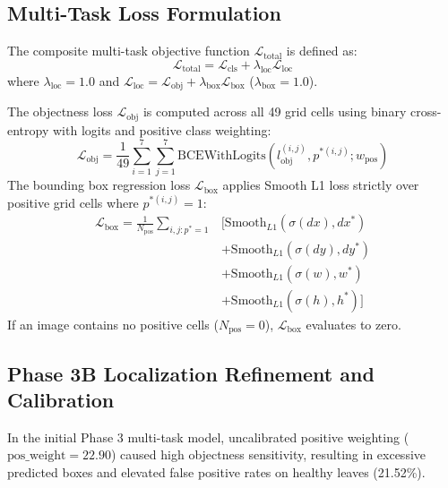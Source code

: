 \subsection{Multi-Task Loss Formulation}
The composite multi-task objective function $\mathcal{L}_{\text{total}}$ is defined as:
\begin{equation}
\mathcal{L}_{\text{total}} = \mathcal{L}_{\text{cls}} + \lambda_{\text{loc}} \mathcal{L}_{\text{loc}}
\end{equation}
where $\lambda_{\text{loc}} = 1.0$ and $\mathcal{L}_{\text{loc}} = \mathcal{L}_{\text{obj}} + \lambda_{\text{box}} \mathcal{L}_{\text{box}}$ ($\lambda_{\text{box}} = 1.0$).

The objectness loss $\mathcal{L}_{\text{obj}}$ is computed across all 49 grid cells using binary cross-entropy with logits and positive class weighting:
\begin{equation}
\mathcal{L}_{\text{obj}} = \frac{1}{49}\sum_{i=1}^7 \sum_{j=1}^7 \text{BCEWithLogits}(l_{\text{obj}}^{(i,j)}, p^{*(i,j)}; w_{\text{pos}})
\end{equation}
The bounding box regression loss $\mathcal{L}_{\text{box}}$ applies Smooth L1 loss strictly over positive grid cells where $p^{*(i,j)} = 1$:
\begin{equation}
\begin{aligned}
\mathcal{L}_{\text{box}} = \frac{1}{N_{\text{pos}}} \sum_{i,j: p^*=1} & \Big[ \text{Smooth}_{L1}(\sigma(dx), dx^*) \\
& + \text{Smooth}_{L1}(\sigma(dy), dy^*) \\
& + \text{Smooth}_{L1}(\sigma(w), w^*) \\
& + \text{Smooth}_{L1}(\sigma(h), h^*) \Big]
\end{aligned}
\end{equation}
If an image contains no positive cells ($N_{\text{pos}} = 0$), $\mathcal{L}_{\text{box}}$ evaluates to zero.

\subsection{Phase 3B Localization Refinement and Calibration}
In the initial Phase 3 multi-task model, uncalibrated positive weighting ($\text{pos\_weight} = 22.90$) caused high objectness sensitivity, resulting in excessive predicted boxes and elevated false positive rates on healthy leaves (21.52\%). 

